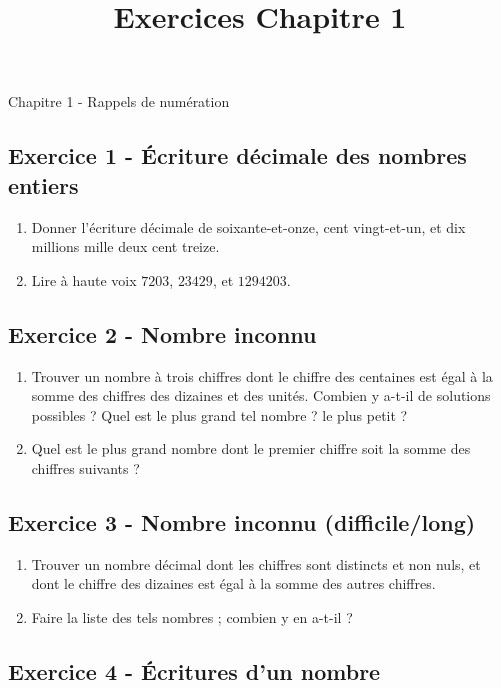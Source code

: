 \documentclass[12 pt]{extarticle}
\title{Exercices Chapitre 1}
\date{}
\theoremstyle{plain}
\begin{document}
\begin{center}{\Large Chapitre 1 - Rappels de  numération}\\ 
 \end{center}
 
 
 \subsection*{Exercice 1 - Écriture décimale des nombres entiers}
 
 \begin{enumerate}
 \item Donner l'écriture décimale de soixante-et-onze, cent vingt-et-un, et dix millions mille deux cent treize. 
 \item Lire à haute voix $7203$, $23429$, et $1294203$. 
\end{enumerate} 
 
 
  
\subsection*{Exercice 2 - Nombre inconnu }
\begin{enumerate}
\item Trouver un nombre à trois chiffres dont le chiffre des centaines est égal à la somme des chiffres des dizaines et des unités. Combien y a-t-il de solutions possibles ? Quel est le plus grand tel nombre ? le plus petit ? 
\item Quel est le plus grand nombre dont le premier chiffre soit la somme des chiffres suivants ?
 
 \end{enumerate}
 
 
 
 
\subsection*{Exercice 3 - Nombre inconnu (difficile/long)}
 \begin{enumerate}
\item Trouver un nombre décimal dont les chiffres sont distincts et non nuls, et dont le chiffre des dizaines est égal à la somme des autres chiffres. 
\item Faire la liste des tels nombres ; combien y en a-t-il ? 
\end{enumerate}

\subsection*{Exercice 4 - Écritures d'un nombre}
\end{document}
